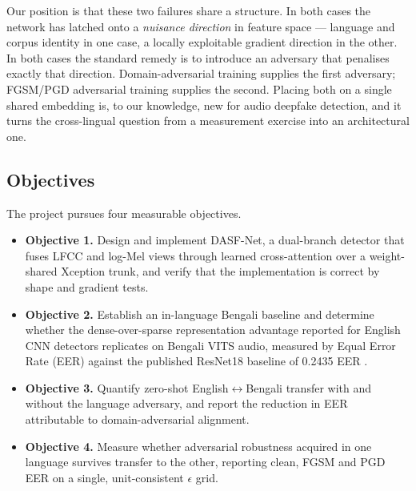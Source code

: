 \documentclass[conference]{IEEEtran}
\begin{document}
Our position is that these two failures share a structure. In both cases the
network has latched onto a \emph{nuisance direction} in feature space ---
language and corpus identity in one case, a locally exploitable gradient
direction in the other. In both cases the standard remedy is to introduce an
adversary that penalises exactly that direction. Domain-adversarial training
\cite{ganin2016dann} supplies the first adversary; FGSM/PGD adversarial
training \cite{goodfellow2015fgsm,madry2018pgd} supplies the second. Placing
both on a single shared embedding is, to our knowledge, new for audio deepfake
detection, and it turns the cross-lingual question from a measurement exercise
into an architectural one.

\subsection{Objectives}
The project pursues four measurable objectives.

\begin{itemize}
\item \textbf{Objective 1.} Design and implement DASF-Net, a dual-branch
      detector that fuses LFCC and log-Mel views through learned
      cross-attention over a weight-shared Xception trunk, and verify that the
      implementation is correct by shape and gradient tests.
\item \textbf{Objective 2.} Establish an in-language Bengali baseline and
      determine whether the dense-over-sparse representation advantage
      reported for English CNN detectors \cite{ahmed2026melspec} replicates on
      Bengali VITS audio, measured by Equal Error Rate (EER) against the
      published ResNet18 baseline of 0.2435 EER \cite{samu2025zeroshot}.
\item \textbf{Objective 3.} Quantify zero-shot English$\leftrightarrow$Bengali
      transfer with and without the language adversary, and report the
      reduction in EER attributable to domain-adversarial alignment.
\item \textbf{Objective 4.} Measure whether adversarial robustness acquired in
      one language survives transfer to the other, reporting clean, FGSM and
      PGD EER on a single, unit-consistent $\epsilon$ grid.
\end{itemize}
\end{document}
